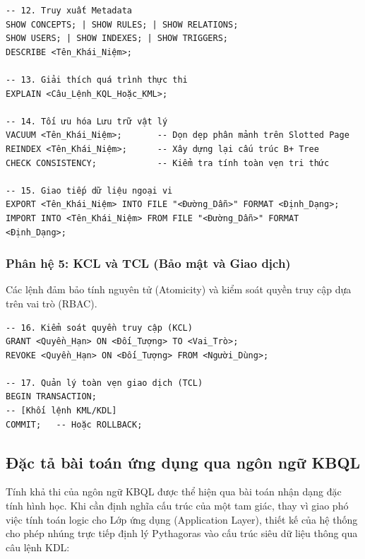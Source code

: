 \documentclass[13pt,a4paper,oneside]{extreport}
\begin{document}
\begin{academicbox}
\begin{Verbatim}[commandchars=\\\{\},breaklines=true,breakanywhere=true,fontfamily=tt,fontsize=\small]
-- 12. Truy xuất Metadata
SHOW CONCEPTS; | SHOW RULES; | SHOW RELATIONS; 
SHOW USERS; | SHOW INDEXES; | SHOW TRIGGERS;
DESCRIBE <Tên_Khái_Niệm>;

-- 13. Giải thích quá trình thực thi
EXPLAIN <Câu_Lệnh_KQL_Hoặc_KML>;

-- 14. Tối ưu hóa Lưu trữ vật lý
VACUUM <Tên_Khái_Niệm>;       -- Dọn dẹp phân mảnh trên Slotted Page
REINDEX <Tên_Khái_Niệm>;      -- Xây dựng lại cấu trúc B+ Tree
CHECK CONSISTENCY;            -- Kiểm tra tính toàn vẹn tri thức

-- 15. Giao tiếp dữ liệu ngoại vi
EXPORT <Tên_Khái_Niệm> INTO FILE "<Đường_Dẫn>" FORMAT <Định_Dạng>;
IMPORT INTO <Tên_Khái_Niệm> FROM FILE "<Đường_Dẫn>" FORMAT <Định_Dạng>;
\end{Verbatim}
\end{academicbox}




\subsubsection{Phân hệ 5: KCL và TCL (Bảo mật và Giao dịch)}

Các lệnh đảm bảo tính nguyên tử (Atomicity) và kiểm soát quyền truy cập dựa trên vai trò (RBAC).


\begin{academicbox}
\begin{Verbatim}[commandchars=\\\{\},breaklines=true,breakanywhere=true,fontfamily=tt,fontsize=\small]
-- 16. Kiểm soát quyền truy cập (KCL)
GRANT <Quyền_Hạn> ON <Đối_Tượng> TO <Vai_Trò>;
REVOKE <Quyền_Hạn> ON <Đối_Tượng> FROM <Người_Dùng>;

-- 17. Quản lý toàn vẹn giao dịch (TCL)
BEGIN TRANSACTION;
-- [Khối lệnh KML/KDL]
COMMIT;   -- Hoặc ROLLBACK;
\end{Verbatim}
\end{academicbox}




\subsection{Đặc tả bài toán ứng dụng qua ngôn ngữ KBQL}


Tính khả thi của ngôn ngữ KBQL được thể hiện qua bài toán nhận dạng đặc tính hình học. Khi cần định nghĩa cấu trúc của một tam giác, thay vì giao phó việc tính toán logic cho Lớp ứng dụng (Application Layer), thiết kế của hệ thống cho phép nhúng trực tiếp định lý Pythagoras vào cấu trúc siêu dữ liệu thông qua câu lệnh KDL:
\end{document}
